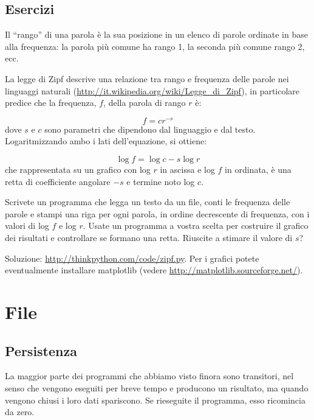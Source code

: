 \documentclass[10pt]{book}
\begin{document}
\section{Esercizi}

\begin{exercise}

Il ``rango'' di una parola è la sua posizione in un elenco di parole ordinate in base alla frequenza: la parola più comune ha rango 1, la seconda più comune rango 2, ecc.

La legge di Zipf descrive una relazione tra rango e frequenza delle parole nei linguaggi naturali
(\url{http://it.wikipedia.org/wiki/Legge_di_Zipf}), in particolare predice che la frequenza, $f$, della parola di rango $r$ è:

\[ f = c r^{-s} \]
%
dove $s$ e $c$ sono parametri che dipendono dal linguaggio e dal testo. Logaritmizzando ambo i lati dell'equazione, si ottiene:

\[ \log f = \log c - s \log r \]
%
che rappresentata su un grafico con log $r$ in ascissa e log $f$ in ordinata, è una retta di coefficiente angolare $-s$ e termine noto log $c$.

Scrivete un programma che legga un testo da un file, conti le frequenza delle parole e stampi una riga per ogni parola, in ordine decrescente di frequenza, con i valori di log $f$ e log $r$.  Usate un programma a vostra scelta per costruire il grafico dei risultati e controllare se formano una retta. Riuscite a stimare il valore di $s$?

Soluzione: \url{http://thinkpython.com/code/zipf.py}.  Per i grafici potete eventualmente installare matplotlib (vedere
\url{http://matplotlib.sourceforge.net/}).

\end{exercise}


\chapter{File}


\section{Persistenza}

La maggior parte dei programmi che abbiamo visto finora sono transitori, nel senso che vengono eseguiti per breve tempo e producono un risultato, ma quando vengono chiusi i loro dati spariscono. Se rieseguite il programma, esso ricomincia da zero.
\end{document}
